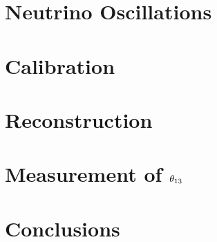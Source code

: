 \documentclass{ucbthesis}
\begin{document}
\listoftodos

\chapter{Neutrino Oscillations}



\chapter{Calibration}
\label{ch:calibration}

\chapter{Reconstruction}






\chapter{Measurement of \texorpdfstring{$\theta_{13}$}{theta13}}

\chapter{Conclusions}

\printbibliography

\appendix


\end{document}
